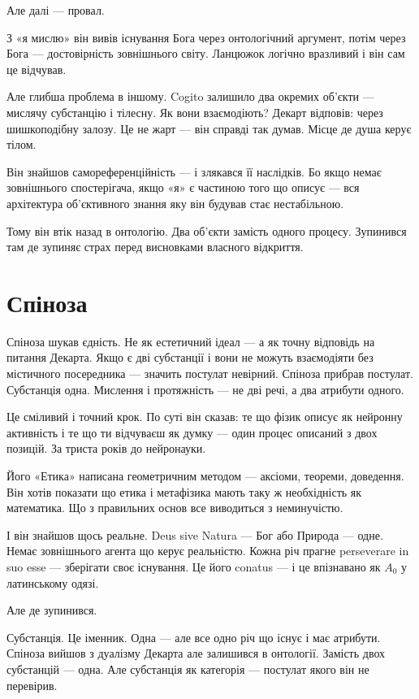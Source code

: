 \documentclass[12pt, a4paper, openany]{book}
\begin{document}
Але далі --- провал.

З «я мислю» він вивів існування Бога через онтологічний аргумент, потім через Бога --- достовірність зовнішнього світу. Ланцюжок логічно вразливий і він сам це відчував.

Але глибша проблема в іншому. Cogito залишило два окремих об'єкти --- мислячу субстанцію і тілесну. Як вони взаємодіють? Декарт відповів: через шишкоподібну залозу. Це не жарт --- він справді так думав. Місце де душа керує тілом.

Він знайшов самореференційність --- і злякався її наслідків. Бо якщо немає зовнішнього спостерігача, якщо «я» є частиною того що описує --- вся архітектура об'єктивного знання яку він будував стає нестабільною.

Тому він втік назад в онтологію. Два об'єкти замість одного процесу. Зупинився там де зупиняє страх перед висновками власного відкриття.

\section{Спіноза}

Спіноза шукав єдність. Не як естетичний ідеал --- а як точну відповідь на питання Декарта. Якщо є дві субстанції і вони не можуть взаємодіяти без містичного посередника --- значить постулат невірний. Спіноза прибрав постулат. Субстанція одна. Мислення і протяжність --- не дві речі, а два атрибути одного.

Це сміливий і точний крок. По суті він сказав: те що фізик описує як нейронну активність і те що ти відчуваєш як думку --- один процес описаний з двох позицій. За триста років до нейронауки.

Його «Етика» написана геометричним методом --- аксіоми, теореми, доведення. Він хотів показати що етика і метафізика мають таку ж необхідність як математика. Що з правильних основ все виводиться з неминучістю.

І він знайшов щось реальне. Deus sive Natura --- Бог або Природа --- одне. Немає зовнішнього агента що керує реальністю. Кожна річ прагне perseverare in suo esse --- зберігати своє існування. Це його conatus --- і це впізнавано як $A_0$ у латинському одязі.

Але де зупинився.

Субстанція. Це іменник. Одна --- але все одно річ що існує і має атрибути. Спіноза вийшов з дуалізму Декарта але залишився в онтології. Замість двох субстанцій --- одна. Але субстанція як категорія --- постулат якого він не перевірив.
\end{document}
